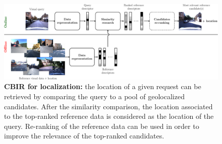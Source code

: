 \begin{figure}[t]
	\centering

	\includegraphics[width=\linewidth]{methods/cbir_for_localization}
	\caption[CBIR for localization]{\label{fig:cbir_for_localization}\textbf{CBIR for localization:} the location of a given request can be retrieved by comparing the query to a pool of geolocalized candidates. After the similarity comparison, the location associated to the top-ranked reference data is considered as the location of the query. Re-ranking of the reference data can be used in order to improve the relevance of the top-ranked candidates.}
\end{figure}

